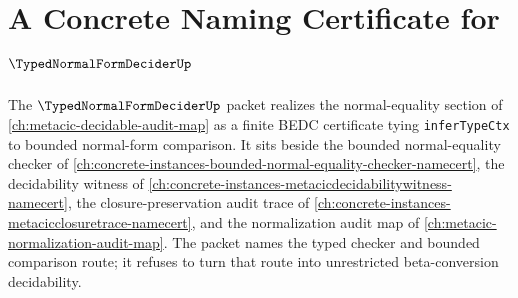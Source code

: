 \chapter{A Concrete Naming Certificate for $\TypedNormalFormDeciderUp$}
\label{ch:concrete-instances-typed-normal-form-decider-namecert}

The $\TypedNormalFormDeciderUp$ packet realizes the normal-equality section of \autoref{ch:metacic-decidable-audit-map} as a finite BEDC certificate tying \texttt{inferTypeCtx} to bounded normal-form comparison. It sits beside the bounded normal-equality checker of \autoref{ch:concrete-instances-bounded-normal-equality-checker-namecert}, the decidability witness of \autoref{ch:concrete-instances-metacicdecidabilitywitness-namecert}, the closure-preservation audit trace of \autoref{ch:concrete-instances-metacicclosuretrace-namecert}, and the normalization audit map of \autoref{ch:metacic-normalization-audit-map}. The packet names the typed checker and bounded comparison route; it refuses to turn that route into unrestricted beta-conversion decidability.



